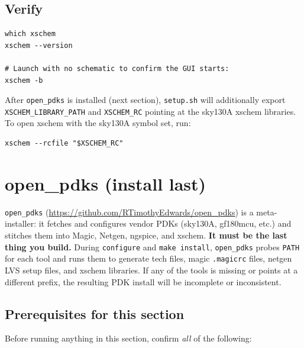 \documentclass[11pt]{article}
\begin{document}
\subsection{Verify}

\begin{lstlisting}
which xschem
xschem --version

# Launch with no schematic to confirm the GUI starts:
xschem -b
\end{lstlisting}

\noindent After \texttt{open\_pdks} is installed (next section),
\texttt{setup.sh} will additionally export \texttt{XSCHEM\_LIBRARY\_PATH}
and \texttt{XSCHEM\_RC} pointing at the sky130A xschem libraries. To open
xschem with the sky130A symbol set, run:

\begin{lstlisting}
xschem --rcfile "$XSCHEM_RC"
\end{lstlisting}

\section{open\_pdks (install last)}

\texttt{open\_pdks} (\url{https://github.com/RTimothyEdwards/open_pdks}) is
a meta-installer: it fetches and configures vendor PDKs (sky130A, gf180mcu,
etc.) and stitches them into Magic, Netgen, ngspice, and xschem. \textbf{It
must be the last thing you build.} During \texttt{configure} and
\texttt{make install}, \texttt{open\_pdks} probes \texttt{PATH} for each
tool and runs them to generate tech files, magic \texttt{.magicrc} files,
netgen LVS setup files, and xschem libraries. If any of the tools is
missing or points at a different prefix, the resulting PDK install will be
incomplete or inconsistent.

\subsection*{Prerequisites for this section}

Before running anything in this section, confirm \emph{all} of the
following:
\end{document}

